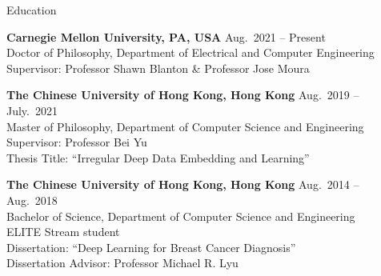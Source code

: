 

\begin{rSection}{Education}

{\bf Carnegie Mellon University, PA, USA} \hfill {Aug.~2021 -- Present} \\ 
Doctor of Philosophy, Department of Electrical and Computer Engineering  \\
Supervisor: Professor Shawn Blanton \& Professor Jose Moura 

{\bf The Chinese University of Hong Kong, Hong Kong} \hfill {Aug.~2019 -- July.~2021} \\ 
Master of Philosophy, Department of Computer Science and Engineering \\
Supervisor: Professor Bei Yu \\
Thesis Title: ``Irregular Deep Data Embedding and Learning''

{\bf The Chinese University of Hong Kong, Hong Kong} \hfill {Aug.~2014 -- Aug.~2018} \\ 
Bachelor of Science, Department of Computer Science and Engineering \\
ELITE Stream student \\
Dissertation: ``Deep Learning for Breast Cancer Diagnosis'' \\ 
Dissertation Advisor: Professor Michael R. Lyu
\end{rSection}




